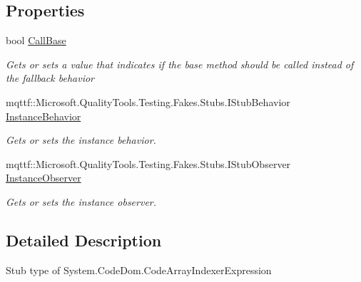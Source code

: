 \subsection*{Properties}
\begin{DoxyCompactItemize}
\item 
bool \hyperlink{class_system_1_1_code_dom_1_1_fakes_1_1_stub_code_array_indexer_expression_a48eeedc3169c5859cc087eb31f136bf5}{Call\-Base}
\begin{DoxyCompactList}\small\item\em Gets or sets a value that indicates if the base method should be called instead of the fallback behavior\end{DoxyCompactList}\item 
mqttf\-::\-Microsoft.\-Quality\-Tools.\-Testing.\-Fakes.\-Stubs.\-I\-Stub\-Behavior \hyperlink{class_system_1_1_code_dom_1_1_fakes_1_1_stub_code_array_indexer_expression_a732404d56c897ece5e66b736aa1d6cd9}{Instance\-Behavior}
\begin{DoxyCompactList}\small\item\em Gets or sets the instance behavior.\end{DoxyCompactList}\item 
mqttf\-::\-Microsoft.\-Quality\-Tools.\-Testing.\-Fakes.\-Stubs.\-I\-Stub\-Observer \hyperlink{class_system_1_1_code_dom_1_1_fakes_1_1_stub_code_array_indexer_expression_af7decab22b450d53219a32f5c72fffd0}{Instance\-Observer}
\begin{DoxyCompactList}\small\item\em Gets or sets the instance observer.\end{DoxyCompactList}\end{DoxyCompactItemize}


\subsection{Detailed Description}
Stub type of System.\-Code\-Dom.\-Code\-Array\-Indexer\-Expression



